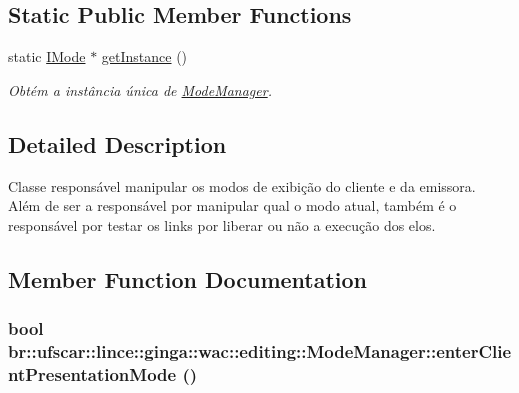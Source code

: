 \subsection*{Static Public Member Functions}
\begin{DoxyCompactItemize}
\item 
static \hyperlink{classbr_1_1ufscar_1_1lince_1_1ginga_1_1wac_1_1editing_1_1IMode}{IMode} $\ast$ \hyperlink{classbr_1_1ufscar_1_1lince_1_1ginga_1_1wac_1_1editing_1_1ModeManager_a1a25cc97eb5724636f205765e03ad785}{getInstance} ()
\begin{DoxyCompactList}\small\item\em Obtém a instância única de \hyperlink{classbr_1_1ufscar_1_1lince_1_1ginga_1_1wac_1_1editing_1_1ModeManager}{ModeManager}. \item\end{DoxyCompactList}\end{DoxyCompactItemize}


\subsection{Detailed Description}
Classe responsável manipular os modos de exibição do cliente e da emissora. Além de ser a responsável por manipular qual o modo atual, também é o responsável por testar os links por liberar ou não a execução dos elos. 

\subsection{Member Function Documentation}
\hypertarget{classbr_1_1ufscar_1_1lince_1_1ginga_1_1wac_1_1editing_1_1ModeManager_a5f62cca336317833ac6565a0acc779e6}{
\subsubsection[{enterClientPresentationMode}]{\setlength{\rightskip}{0pt plus 5cm}bool br::ufscar::lince::ginga::wac::editing::ModeManager::enterClientPresentationMode ()}}
\label{classbr_1_1ufscar_1_1lince_1_1ginga_1_1wac_1_1editing_1_1ModeManager_a5f62cca336317833ac6565a0acc779e6}


